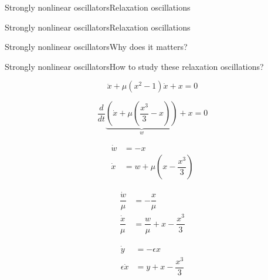 \documentclass[usenames,dvipsnames,svgnames,10pt,aspectratio=169]{beamer}
\begin{document}
\begin{frame}[t, c]{Strongly nonlinear oscillators}{Relaxation oscillations}

  \centering
  
 \end{frame}

\begin{frame}[t, c]{Strongly nonlinear oscillators}{Relaxation oscillations}
  \centering
\end{frame}





\begin{frame}[t, c]{Strongly nonlinear oscillators}{Why does it matters?}
  \centering
\end{frame}





\begin{frame}[t, c]{Strongly nonlinear oscillators}{How to study these relaxation oscillations?}
  \begin{overprint}
    \[
    \ddot{x} + \mu \left( x^2 - 1 \right) \dot{x} + x = 0
    \]
    
    \[
    \dfrac{d}{dt} \underbrace{\left(\dot{x} + \mu \left( \dfrac{x^3}{3} - x \right) \right)}_{w} + x = 0
    \]
    
    \[
    \begin{aligned}
      \dot{w} & = - x \\
      \dot{x} & = w + \mu \left( x - \dfrac{x^3}{3} \right)
    \end{aligned}
    \]

    \[
    \begin{aligned}
      \dfrac{\dot{w}}{\mu} & = - \dfrac{x}{\mu} \\
      \dfrac{\dot{x}}{\mu} & = \dfrac{w}{\mu} + x - \dfrac{x^3}{3}
    \end{aligned}
    \]

    \[
    \begin{aligned}
      \dot{y} & = - \epsilon x \\
      \epsilon \dot{x} & = y + x - \dfrac{x^3}{3}
    \end{aligned}
    \]
    
  \end{overprint}
\end{frame}
\end{document}
